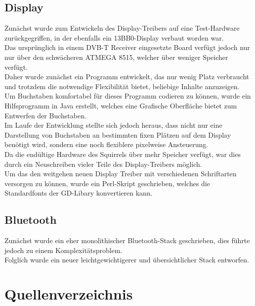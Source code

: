 \documentclass[12pt,a4paper]{article}
\begin{document}
\subsection{Display}
Zunächst wurde zum Entwickeln des Display-Treibers auf eine Test-Hardware zurückgegriffen, in der ebenfalls ein 13BB0-Display verbaut worden war.\\
Das ursprünglich in einem DVB-T Receiver eingesetzte Board verfügt jedoch nur nur über den schwächeren ATMEGA 8515, welcher über weniger Speicher verfügt.\\
Daher wurde zunächst ein Programm entwickelt, das nur wenig Platz verbraucht und trotzdem die notwendige Flexibilität bietet, beliebige Inhalte anzuzeigen.\\
Um Buchstaben komfortabel für dieses Programm codieren zu können, wurde ein Hilfsprogramm in Java erstellt, welches eine Grafische Oberfläche bietet zum Entwerfen der Buchstaben.\\
Im Laufe der Entwicklung stellte sich jedoch heraus, dass nicht nur eine Darstellung von Buchstaben an bestimmten fixen Plätzen auf dem Display benötigt wird, sondern eine noch flexiblere pixelweise Ansteuerung.\\
Da die endültige Hardware des Squirrels über mehr Speicher verfügt, war dies durch ein Neuschreiben vieler Teile des Display-Treibers möglich.\\
 Um das den weitgehen neuen Display Treiber mit verschiedenen Schriftarten versorgen zu können, wurde ein Perl-Skript geschrieben, welches die Standardfonts der GD-Libary konvertieren kann.\\



\subsection{Bluetooth}
Zunächst wurde ein eher monolithischer Bluetooth-Stack geschrieben, dies führte jedoch zu einem Komplexitätsproblem.\\
Folglich wurde ein neuer leichtgewichtigerer und übersichtlicher Stack entworfen.


\section{Quellenverzeichnis}
\end{document}
